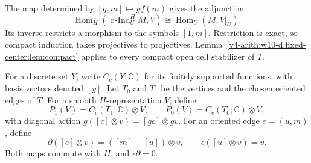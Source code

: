 The map determined by $[g,m]\mapsto g f(m)$ gives the adjunction
\[
 \operatorname{Hom}_H(\operatorname{c\!\operatorname{-}Ind}_U^H M,V)\cong\operatorname{Hom}_U(M,V|_U).
\]
Its inverse restricts a morphism to the symbols $[1,m]$.
Restriction is exact, so compact induction takes projectives to projectives.
Lemma~\ref{v4-arith:w10-d:fixed-center:lem:compact} applies to every compact open cell stabilizer of $T$.

For a discrete set $Y$, write $C_c(Y;\mathbb C)$ for its finitely supported functions,
with basis vectors denoted $[y]$.
Let $T_0$ and $T_1$ be the vertices and the chosen oriented edges of $T$.
For a smooth $H$-representation $V$, define
\[
 P_1(V)=C_c(T_1;\mathbb C)\otimes V,\qquad
 P_0(V)=C_c(T_0;\mathbb C)\otimes V,
\]
with diagonal action $g([c]\otimes v)=[gc]\otimes gv$.
For an oriented edge $e=(u,m)$, define
\[
 \partial([e]\otimes v)=([m]-[u])\otimes v,
 \qquad \epsilon([u]\otimes v)=v.
\]
Both maps commute with $H$, and $\epsilon\partial=0$.


